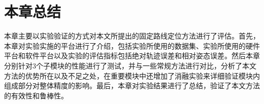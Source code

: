 \section{本章总结}

本章主要以实验验证的方式对本文所提出的固定路线定位方法进行了评估。首先，本章对实验实施的平台进行了介绍，包括实验所使用的数据集、实验所使用的硬件平台和软件平台以及实验的评估指标包括绝对轨迹误差和相对姿态误差。然后本章分别针对3个子模块的性能进行了测试，并与一些常规方法进行对比，分析了本文方法的优势所在以及不足之处，在重要模块中还增加了消融实验来详细验证模块内组成部分对整体精度的影响。最后，本章对实验结果进行了总结，验证了本文方法的有效性和鲁棒性。